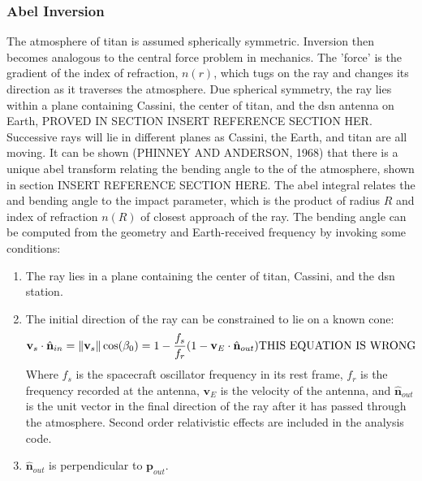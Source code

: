 \documentclass{article}
\begin{document}
            \subsubsection{\footnotesize Abel Inversion}
            
            The atmosphere of \gls{titan} is assumed spherically symmetric. Inversion then becomes analogous to the central force problem in mechanics. The 'force' is the gradient of the \gls{index of refraction}, $n(r)$, which tugs on the ray and changes its direction as it traverses the atmosphere. Due spherical symmetry, the ray lies within a plane containing Cassini, the center of \gls{titan}, and the \gls{dsn} antenna on Earth, PROVED IN SECTION INSERT REFERENCE SECTION HER. Successive rays will lie in different planes as Cassini, the Earth, and \gls{titan} are all moving. It can be shown (PHINNEY AND ANDERSON, 1968) that there is a unique \gls{abel transform} relating the bending angle to the  of the atmosphere, shown in section INSERT REFERENCE SECTION HERE. The \gls{abel integral} relates the  and \gls{bending angle} to the \gls{impact parameter}, which is the product of radius $R$ and index of refraction $n(R)$ of closest approach of the ray. The \gls{bending angle} can be computed from the geometry and Earth-received \gls{frequency} by invoking some conditions:
            
            \begin{enumerate}
            \item The ray lies in a plane containing the center of \gls{titan}, Cassini, and the \gls{dsn} station. 
            \item The initial direction of the ray can be constrained to lie on a known cone:
            \begin{equation}
            \mathbf{v}_{s}\cdot \hat{\mathbf{n}}_{in} = \lVert\mathbf{v}_{s}\rVert\cos(\beta_0) = 1-\frac{f_s}{f_r}(1-\mathbf{v}_{E}\cdot \hat{\mathbf{n}}_{out})\textrm{THIS EQUATION IS WRONG}
            \end{equation}
            Where $f_s$ is the spacecraft oscillator frequency in its rest frame, $f_r$ is the frequency recorded at the antenna, $\mathbf{v}_{E}$ is the velocity of the antenna, and $\hat{\mathbf{n}}_{out}$ is the unit vector in the final direction of the ray after it has passed through the atmosphere. Second order relativistic effects are included in the analysis code.
            \item $\hat{\mathbf{n}}_{out}$ is perpendicular to $\mathbf{p}_{out}$.
            \end{enumerate}
            
\end{document}
